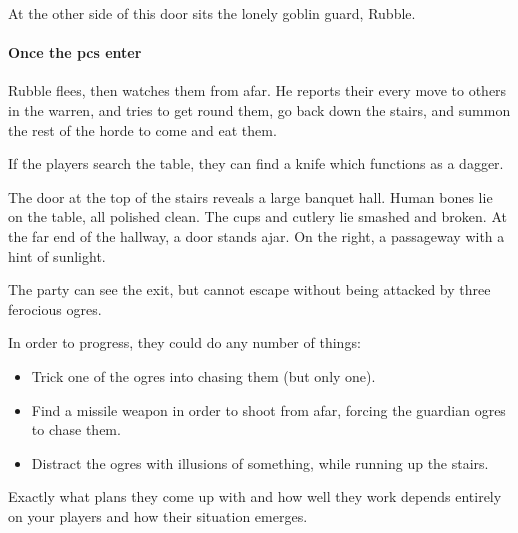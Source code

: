 \begin{multicols}{2}



At the other side of this door sits the lonely goblin guard, Rubble.

\paragraph{Once the \glspl{pc} enter}
Rubble flees, then watches them from afar.
He reports their every move to others in the warren, and tries to get round them, go back down the stairs, and summon the rest of the horde to come and eat them.



If the players search the table,
they can find a knife which functions as a dagger.

\begin{boxtext}
  The door at the top of the stairs reveals a large banquet hall.
  Human bones lie on the table, all polished clean.
  The cups and cutlery lie smashed and broken.
  At the far end of the hallway, a door stands ajar.
  On the right, a passageway with a hint of sunlight.
\end{boxtext}


The party can see the exit, but cannot escape without being attacked by three ferocious ogres.

In order to progress, they could do any number of things:

\begin{itemize}

  \item
  Trick one of the ogres into chasing them (but only one).
  \item
  Find a missile weapon in order to shoot from afar, forcing the guardian ogres to chase them.
  \item
  Distract the ogres with illusions of something, while running up the stairs.

\end{itemize}

Exactly what plans they come up with and how well they work depends entirely on your players and how their situation emerges.


\end{multicols}
